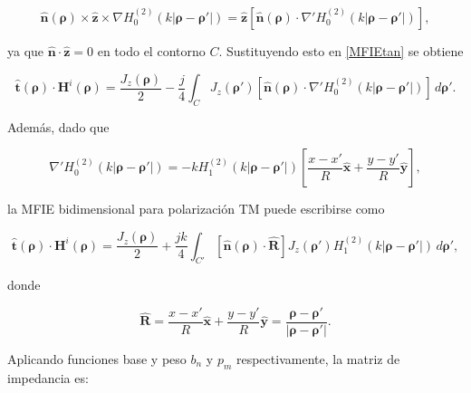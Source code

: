 \documentclass[11pt,a4paper,twoside,pdf]{article}
\numberwithin{equation}{section}
\begin{document}
\begin{equation}
\hat{\mathbf{n}}(\boldsymbol{\rho}) \times
\hat{\mathbf{z}} \times
\nabla H_0^{(2)}\!\left( k \lvert \boldsymbol{\rho} - \boldsymbol{\rho}' \rvert \right)
=
\hat{\mathbf{z}}
\left[
\hat{\mathbf{n}}(\boldsymbol{\rho}) \cdot
\nabla' H_0^{(2)}\!\left( k \lvert \boldsymbol{\rho} - \boldsymbol{\rho}' \rvert \right)
\right],
\end{equation}

ya que
$\hat{\mathbf{n}} \cdot \hat{\mathbf{z}} = 0$
en todo el contorno $C$.
Sustituyendo esto en \ref{MFIEtan} se obtiene

\begin{equation}
\hat{\mathbf{t}}(\boldsymbol{\rho}) \cdot \mathbf{H}^i(\boldsymbol{\rho})
=
\frac{J_z(\boldsymbol{\rho})}{2}
-
\frac{j}{4}
\int_{C}
J_z(\boldsymbol{\rho}')
\left[
\hat{\mathbf{n}}(\boldsymbol{\rho}) \cdot
\nabla' H_0^{(2)}\!\left( k \lvert \boldsymbol{\rho} - \boldsymbol{\rho}' \rvert \right)
\right]
\, d\boldsymbol{\rho'}.
\end{equation}

Además, dado que

\begin{equation}
\nabla' H_0^{(2)}\!\left( k \lvert \boldsymbol{\rho} - \boldsymbol{\rho}' \rvert \right)
=
- k H_1^{(2)}\!\left( k \lvert \boldsymbol{\rho} - \boldsymbol{\rho}' \rvert \right)
\left[
\frac{x - x'}{R} \hat{\mathbf{x}}
+
\frac{y - y'}{R} \hat{\mathbf{y}}
\right],
\end{equation}

la MFIE bidimensional para polarización TM puede escribirse como

\begin{equation}
\hat{\mathbf{t}}(\boldsymbol{\rho}) \cdot \mathbf{H}^i(\boldsymbol{\rho})
=
\frac{J_z(\boldsymbol{\rho})}{2}
+
\frac{j k}{4}
\int_{C'}
\left[
\hat{\mathbf{n}}(\boldsymbol{\rho}) \cdot \hat{\mathbf{R}}
\right]
J_z(\boldsymbol{\rho}')
H_1^{(2)}\!\left( k \lvert \boldsymbol{\rho} - \boldsymbol{\rho}' \rvert \right)
\, d\boldsymbol{\rho}',
\end{equation}

donde

\begin{equation}
\hat{\mathbf{R}}
=
\frac{x - x'}{R} \hat{\mathbf{x}}
+
\frac{y - y'}{R} \hat{\mathbf{y}}
=
\frac{\boldsymbol{\rho} - \boldsymbol{\rho}'}{|\boldsymbol{\rho} - \boldsymbol{\rho}'|}.
\end{equation}


Aplicando funciones base y peso $b_n$ y  $p_m$ respectivamente, la matriz de impedancia es:
\end{document}
